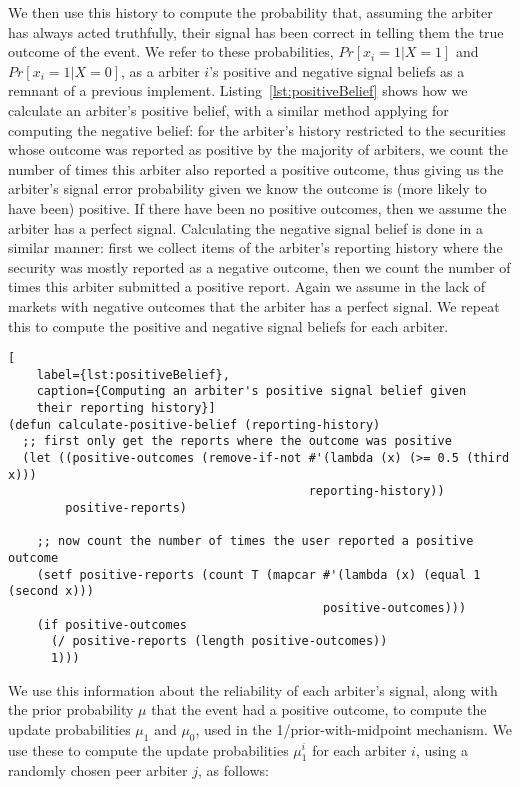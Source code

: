 We then use this history to compute the probability that, assuming the arbiter
has always acted truthfully, their signal has been correct in telling them the
true outcome of the event. We refer to these probabilities, $Pr[x_i=1|X=1]$ and
$Pr[x_i=1|X=0]$, as a arbiter $i$'s positive and negative signal beliefs as a
remnant of a previous implement. Listing~\ref{lst:positiveBelief} shows how we
calculate an arbiter's positive belief, with a similar method applying for
computing the negative belief: for the arbiter's history restricted to the
securities whose outcome was reported as positive by the majority of arbiters,
we count the number of times this arbiter also reported a positive outcome,
thus giving us the arbiter's signal error probability given we know the outcome
is (more likely to have been) positive. If there have been no positive
outcomes, then we assume the arbiter has a perfect signal. Calculating the
negative signal belief is done in a similar manner: first we collect items of
the arbiter's reporting history where the security was mostly reported as a
negative outcome, then we count the number of times this arbiter submitted a
positive report. Again we assume in the lack of markets with negative outcomes
that the arbiter has a perfect signal. We repeat this to compute the positive
and negative signal beliefs for each arbiter.

\begin{lstlisting}[
	label={lst:positiveBelief},
	caption={Computing an arbiter's positive signal belief given
	their reporting history}]
(defun calculate-positive-belief (reporting-history)
  ;; first only get the reports where the outcome was positive
  (let ((positive-outcomes (remove-if-not #'(lambda (x) (>= 0.5 (third x)))
                                          reporting-history))
        positive-reports)

    ;; now count the number of times the user reported a positive outcome
    (setf positive-reports (count T (mapcar #'(lambda (x) (equal 1 (second x)))
                                            positive-outcomes)))
    (if positive-outcomes
      (/ positive-reports (length positive-outcomes))
      1)))
\end{lstlisting}

We use this information about the reliability of each arbiter's signal, along
with the prior probability $\mu$ that the event had a positive outcome, to
compute the update probabilities $\mu_1$ and $\mu_0$, used in the
1/prior-with-midpoint mechanism. We use these to compute the update
probabilities $\mu_1^i$ for each arbiter $i$, using a randomly chosen peer
arbiter $j$, as follows:


